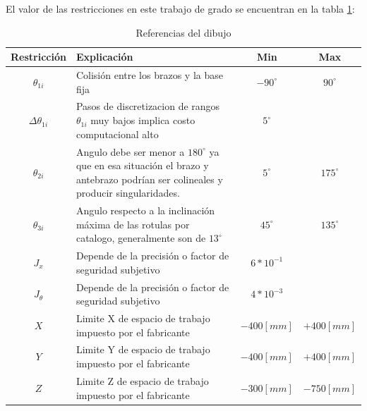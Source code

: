     El valor de las restricciones en este trabajo de grado se encuentran en la tabla \ref{t:cap6_ws_1}: 
    
            \begingroup
            \renewcommand{\arraystretch}{1.3}
            \begin{table}[H]
            \centering
            \begin{tabular}{c m{7.5cm} c c}
               \hline
               \textbf{Restricción}  & \textbf{Explicación} & \textbf{Min}& \textbf{Max}\\
               \hline           \hline            
             $\theta_{1i}$ & Colisión entre los brazos y la base fija & $-90^{\circ}$ & $90^{\circ}$\\
            \hline
             $\Delta\theta _{1i}$ & Pasos de discretizacion de rangos $\theta_{1i}$ muy bajos implica costo computacional alto& $5^{\circ}$ & $ $ \\
            \hline
             $\theta _{2i}$ & Angulo debe ser menor a $180^{\circ}$ ya que en esa situación el brazo y antebrazo podrían ser colineales y producir singularidades.& $5^{\circ}$ & $175^{\circ}$ \\
            \hline
             $\theta _{3i}$ & Angulo respecto a la inclinación máxima de las rotulas por catalogo, generalmente son de $13^{\circ}$ & $45^{\circ}$ & $135^{\circ}$ \\
            \hline
             $J_{x}$ & Depende de la precisión o factor de seguridad subjetivo& $6*10^{-1}$ & $ $ \\
            \hline
             $J_{\theta}$ & Depende de la precisión o factor de seguridad subjetivo& $4*10^{-3}$ & $ $ \\
            \hline
             $X$ & Limite X de espacio de trabajo impuesto por el fabricante & $-400[mm]$ & $+400[mm]$ \\
            \hline            
             $Y$ & Limite Y de espacio de trabajo impuesto por el fabricante & $-400[mm]$ & $+400[mm]$ \\
            \hline   
             $Z$ & Limite Z de espacio de trabajo impuesto por el fabricante & $-300[mm]$ & $-750[mm]$ \\
            \hline   
            \end{tabular}
            \caption{Referencias del dibujo}
            \label{t:cap6_ws_1}
        \end{table}
        \endgroup     
        
        \newpage

